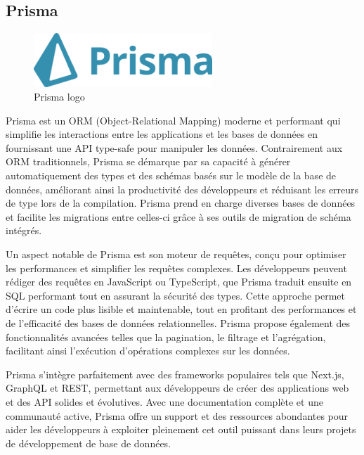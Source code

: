 \documentclass[a4paper,12pt]{report}
\numberwithin{equation}{section}
\begin{document}
\subsection{Prisma}
\begin{figure}[H]
    \centering
    \includegraphics[width=0.6\textwidth]{tech/prisma.png}
    \caption{Prisma logo}
    \label{fig:Prisma logo}
\end{figure}
\par
Prisma est un ORM (Object-Relational Mapping) moderne et performant qui simplifie les interactions entre les applications et les bases de données en fournissant une API type-safe pour manipuler les données. Contrairement aux ORM traditionnels, Prisma se démarque par sa capacité à générer automatiquement des types et des schémas basés sur le modèle de la base de données, améliorant ainsi la productivité des développeurs et réduisant les erreurs de type lors de la compilation. Prisma prend en charge diverses bases de données et facilite les migrations entre celles-ci grâce à ses outils de migration de schéma intégrés.
\\ \par
Un aspect notable de Prisma est son moteur de requêtes, conçu pour optimiser les performances et simplifier les requêtes complexes. Les développeurs peuvent rédiger des requêtes en JavaScript ou TypeScript, que Prisma traduit ensuite en SQL performant tout en assurant la sécurité des types. Cette approche permet d'écrire un code plus lisible et maintenable, tout en profitant des performances et de l'efficacité des bases de données relationnelles. Prisma propose également des fonctionnalités avancées telles que la pagination, le filtrage et l'agrégation, facilitant ainsi l'exécution d'opérations complexes sur les données.
\\ \par
Prisma s'intègre parfaitement avec des frameworks populaires tels que Next.js, GraphQL et REST, permettant aux développeurs de créer des applications web et des API solides et évolutives. Avec une documentation complète et une communauté active, Prisma offre un support et des ressources abondantes pour aider les développeurs à exploiter pleinement cet outil puissant dans leurs projets de développement de base de données.
\newpage
\end{document}
